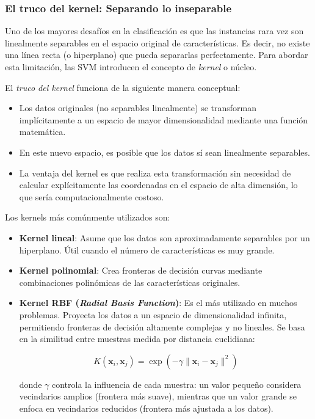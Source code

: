 \subsubsection*{El truco del kernel: Separando lo inseparable}

Uno de los mayores desafíos en la clasificación es que las instancias rara vez son linealmente separables en el espacio original de características. Es decir, no existe una línea recta (o hiperplano) que pueda separarlas perfectamente. Para abordar esta limitación, las SVM introducen el concepto de \textit{kernel} o núcleo.

El \textit{truco del kernel} funciona de la siguiente manera conceptual:

\begin{itemize}
    \item Los datos originales (no separables linealmente) se transforman implícitamente a un espacio de mayor dimensionalidad mediante una función matemática.
    \item En este nuevo espacio, es posible que los datos sí sean linealmente separables.
    \item La ventaja del kernel es que realiza esta transformación sin necesidad de calcular explícitamente las coordenadas en el espacio de alta dimensión, lo que sería computacionalmente costoso.
\end{itemize}

Los kernels más comúnmente utilizados son:

\begin{itemize}
    \item \textbf{Kernel lineal}: Asume que los datos son aproximadamente separables por un hiperplano. Útil cuando el número de características es muy grande.
    
    \item \textbf{Kernel polinomial}: Crea fronteras de decisión curvas mediante combinaciones polinómicas de las características originales.
    
    \item \textbf{Kernel RBF (\textit{Radial Basis Function})}: Es el más utilizado en muchos problemas. Proyecta los datos a un espacio de dimensionalidad infinita, permitiendo fronteras de decisión altamente complejas y no lineales. Se basa en la similitud entre muestras medida por distancia euclidiana:

    \[
    K(\mathbf{x}_i, \mathbf{x}_j) = \exp(-\gamma \|\mathbf{x}_i - \mathbf{x}_j\|^2)
    \]

    donde \(\gamma\) controla la influencia de cada muestra: un valor pequeño considera vecindarios amplios (frontera más suave), mientras que un valor grande se enfoca en vecindarios reducidos (frontera más ajustada a los datos).
\end{itemize}

